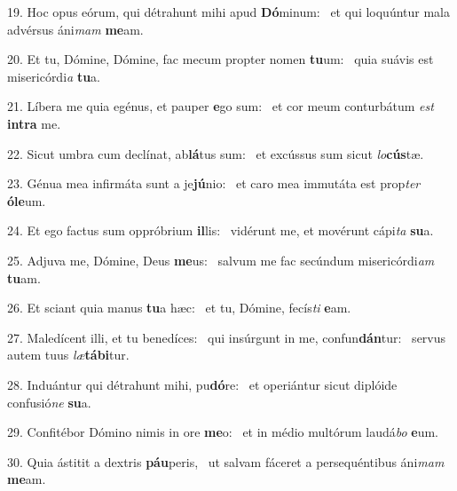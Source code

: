 19. Hoc opus eórum, qui détrahunt mihi apud \textbf{Dó}minum: \ast\  et qui loquúntur mala advérsus áni\textit{mam} \textbf{me}am.\

20. Et tu, Dómine, Dómine, fac mecum propter nomen \textbf{tu}um: \ast\  quia suávis est misericórdi\textit{a} \textbf{tu}a.\

21. Líbera me quia egénus, et pauper \textbf{e}go sum: \ast\  et cor meum conturbátum \textit{est} \textbf{in}\textbf{tra} me.\

22. Sicut umbra cum declínat, ab\textbf{lá}tus sum: \ast\  et excússus sum sicut \textit{lo}\textbf{cús}tæ.\

23. Génua mea infirmáta sunt a je\textbf{jú}nio: \ast\  et caro mea immutáta est prop\textit{ter} \textbf{ó}\textbf{le}um.\

24. Et ego factus sum oppróbrium \textbf{il}lis: \ast\  vidérunt me, et movérunt cápi\textit{ta} \textbf{su}a.\

25. Adjuva me, Dómine, Deus \textbf{me}us: \ast\  salvum me fac secúndum misericórdi\textit{am} \textbf{tu}am.\

26. Et sciant quia manus \textbf{tu}a hæc: \ast\  et tu, Dómine, fecís\textit{ti} \textbf{e}am.\

27. Maledícent illi, et tu benedíces: \dag\  qui insúrgunt in me, confun\textbf{dán}tur: \ast\  servus autem tuus \textit{læ}\textbf{tá}\textbf{bi}tur.\

28. Induántur qui détrahunt mihi, pu\textbf{dó}re: \ast\  et operiántur sicut diplóide confusió\textit{ne} \textbf{su}a.\

29. Confitébor Dómino nimis in ore \textbf{me}o: \ast\  et in médio multórum laudá\textit{bo} \textbf{e}um.\

30. Quia ástitit a dextris \textbf{páu}peris, \ast\  ut salvam fáceret a persequéntibus áni\textit{mam} \textbf{me}am.\


